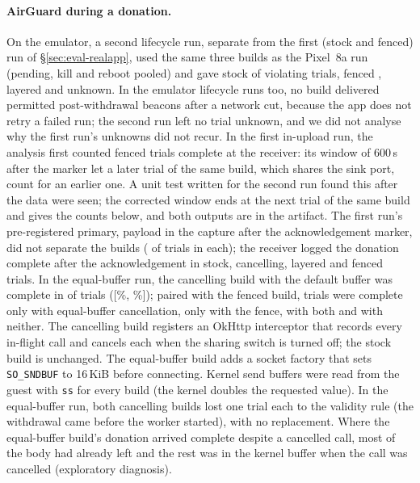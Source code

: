 \paragraph{AirGuard during a donation.}\label{app:airrace} On the emulator, a second lifecycle run, separate from the
first (stock and fenced) run of \S\ref{sec:eval-realapp}, used the same three builds as the Pixel~8a run (pending, kill
and reboot pooled) and gave stock \glayStockViol{} of \glayN{} violating trials, fenced \glayFenceViol{}, layered
\glayLayerViol{} and \glayUnknown{} unknown. In the emulator lifecycle runs too, no build
delivered permitted post-withdrawal beacons after a network cut, because the app does not retry a failed run; the second
run left no trial unknown, and we did not analyse why the first run's unknowns did not recur. In the
first in-upload run, the analysis first counted \gaFenceRxFirst{} fenced trials complete at the receiver: its window of
600\,s after the marker let a later trial of the same build, which shares the sink port, count for an earlier one. A unit
test written for the second run found this after the data were seen; the corrected window ends at the next trial of the
same build and gives the counts below, and both outputs are in the artifact. The first run's pre-registered primary, payload in the capture
after the acknowledgement marker, did not separate the builds (\gaSentMin{} of \gaN{} trials in each); the receiver
logged the donation complete after the acknowledgement in \gaStockRx{} stock, \gaCancelRx{} cancelling, \gaLayerRx{}
layered and \gaFenceRx{} fenced trials. In the equal-buffer run, the cancelling build with the default buffer was
complete in \gbCancelRx{} of \gbCancelN{} trials ([\gbCancelLo{}\%, \gbCancelHi{}\%]); paired with the fenced build,
\gbPairSixteenOnly{} trials were complete only with equal-buffer cancellation, \gbPairFenceOnly{} only with the fence,
\gbPairBoth{} with both and \gbPairNone{} with neither. The cancelling build registers an OkHttp interceptor that records every in-flight
call and cancels each when the sharing switch is turned off; the stock build is unchanged. The equal-buffer build adds a
socket factory that sets \texttt{SO\_SNDBUF} to 16\,KiB before connecting. Kernel send buffers were read from the guest
with \texttt{ss} for every build (the kernel doubles the requested value). In the equal-buffer run, both cancelling builds
lost one trial each to the validity rule (the withdrawal came before the worker started), with no replacement. Where the
equal-buffer build's donation arrived complete despite a cancelled call, most of the body had already left and the rest
was in the kernel buffer when the call was cancelled (exploratory diagnosis).

